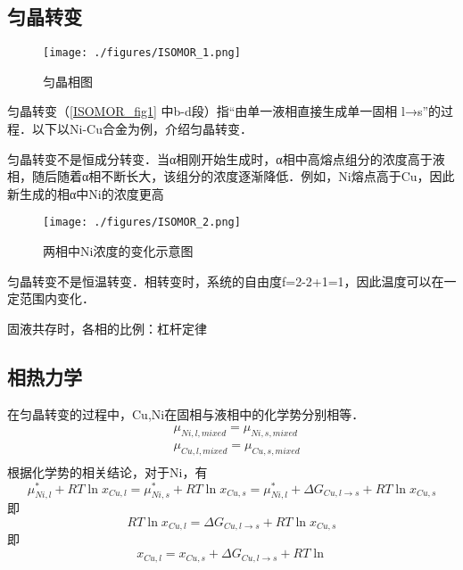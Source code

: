 
\subsection{匀晶转变}

\begin{figure}[ht]
\centering
\texttt{[image: ./figures/ISOMOR\_1.png]}
\caption{匀晶相图} \label{ISOMOR_fig1}
\end{figure}

匀晶转变（\autoref{ISOMOR_fig1} 中b-d段）指“由单一液相直接生成单一固相 l→s”的过程．以下以Ni-Cu合金为例，介绍匀晶转变．

匀晶转变不是恒成分转变．当α相刚开始生成时，α相中高熔点组分的浓度高于液相，随后随着α相不断长大，该组分的浓度逐渐降低．例如，Ni熔点高于Cu，因此新生成的相α中Ni的浓度更高
\begin{figure}[ht]
\centering
\texttt{[image: ./figures/ISOMOR\_2.png]}
\caption{两相中Ni浓度的变化示意图} \label{ISOMOR_fig2}
\end{figure}

匀晶转变不是恒温转变．相转变时，系统的自由度f=2-2+1=1，因此温度可以在一定范围内变化．

固液共存时，各相的比例：杠杆定律

\subsection{相热力学}
在匀晶转变的过程中，Cu,Ni在固相与液相中的化学势分别相等．
\begin{align}
&\mu_{Ni,l,mixed}=\mu_{Ni,s,mixed}\\
&\mu_{Cu,l,mixed}=\mu_{Cu,s,mixed}\\
\end{align}
根据化学势的相关结论，对于Ni，有
\begin{equation}
\mu_{Ni,l}^*+RT \ln x_{Cu,l}=\mu_{Ni,s}^*+RT \ln x_{Cu,s}=\mu_{Ni,l}^*+\Delta G_{Cu, l\rightarrow s} + RT \ln x_{Cu,s}
\end{equation}
即
\begin{equation}
RT \ln x_{Cu,l}=\Delta G_{Cu, l\rightarrow s} + RT \ln x_{Cu,s}
\end{equation}
即
\begin{equation}
x_{Cu,l}=x_{Cu,s}+\Delta G_{Cu, l\rightarrow s} + RT \ln 
\end{equation}